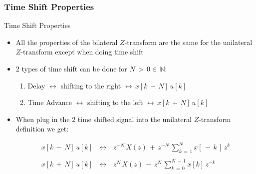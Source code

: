 \documentclass{beamer}
\begin{document}
\subsubsection{Time Shift Properties}

\begin{frame}[t]{Time Shift Properties}

\begin{itemize}

\item All the properties of the bilateral $Z$-transform are the same for the unilateral $Z$-transform except when doing time shift

\item 2 types of time shift can be done for $N \, > \, 0 \in \, \mathbb{N}$:

	\begin{enumerate}
	\item Delay $\leftrightarrow$ shifting to the right $\leftrightarrow \, x[k \,-\, N] \, u[k]$ 
	
	\item Time Advance $\leftrightarrow$ shifting to the left $\leftrightarrow \, x[k \,+\, N] \, u[k]$ 
	\end{enumerate}

\item When plug in the 2 time shifted signal into the unilateral $Z$-transform definition we get:

\begin{equation}
\begin{array}{rcl}
x[k \,-\, N] \, u[k] \, &\leftrightarrow& \, z^{-N} \, X(z) \, + \, z^{-N} \,   \displaystyle\sum_{k \, = \, 1}^{N} x[\, -\,k \,] \, z^k  \\ \\
x[k \,+ \, N] \, u[k] \, &\leftrightarrow& \, z^N \, X(z) \, - \, z^N \,   \displaystyle\sum_{k \, = \, 0}^{N \ - \, 1} x[k] \, z^{-k}
\end{array}
\end{equation} 

\end{itemize}

\end{frame}
\end{document}

